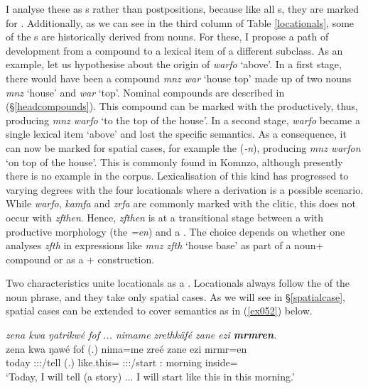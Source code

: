 I analyse these as  s rather than postpositions, because like all s, they are marked for . Additionally, as we can see in the third column of Table \ref{locationals}, some of the  s are historically derived from nouns. For these, I propose a path of development from a  compound to a lexical item of a different  subclass. As an example, let us hypothesise about the origin of \emph{warfo} `above'. In a first stage, there would have been a  compound \emph{mnz war} `house top' made up of two nouns \emph{mnz} `house' and \emph{war} `top'. Nominal compounds are described in (\S{}\ref{headcompounds}). This compound can be marked with the   productively, thus, producing \emph{mnz warfo} `to the top of the house'. In a second stage, \emph{warfo} became a single lexical item `above' and lost the specific  semantics. As a consequence, it can now be marked for spatial cases, for example the   (\emph{-n}), producing \emph{mnz warfon} `on top of the house'. This is commonly found in Komnzo, although presently there is no example in the corpus. Lexicalisation of this kind has progressed to varying degrees with the four locationals where a  derivation is a possible scenario. While \emph{warfo}, \emph{kamfa} and \emph{zrfa} are commonly marked with the   clitic, this does not occur with \emph{zfthen}. Hence, \emph{zfthen} is at a transitional stage between a  with productive morphology (the   \emph{=en}) and a . The choice depends on whether one analyses \emph{zfth} in expressions like \emph{mnz zfth} `house base' as part of a noun+ compound or as a + construction.%

Two characteristics unite locationals as a . Locationals always follow the  of the noun phrase, and they take only spatial cases. As we will see in \S{}\ref{spatialcase}, spatial cases can be extended to cover  semantics as in (\ref{ex052}) below.

\begin{exe}
	\ex \emph{zena kwa ŋatrikwé fof ... nimame zrethkäfé zane ezi \textbf{mrmren}.}\\
	\gll zena kwa ŋawé fof (.) nima=me zreé zane ezi mrmr=en\\
	today \Fut{} \Fsg:\Sbj:\Nonpast:\Ipfv/tell \Emph{} (.) {like.this}=\Ins{} \Fsg:\Sbj:\Irr:\Pfv/start \Dem:\Prox{} morning inside=\Loc{}\\
	\trans `Today, I will tell (a story) ... I will start like this in this morning.'\\ 
	\label{ex052}
\end{exe}

